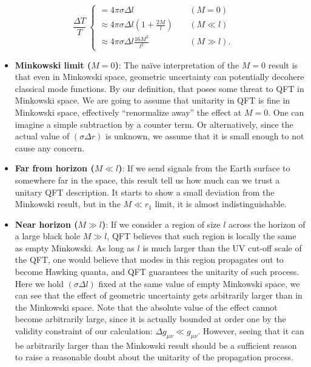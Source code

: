 \documentclass[aps,showpacs,onecolumn,floats,prd,superscriptaddress,nofootinbib]{revtex4-1}
\begin{document}
\begin{equation}
\frac{\Delta T}{T} ~ \begin{cases}
= 4 \pi \sigma \Delta l~	 &\ \ \ \ \ (M = 0)\\
\approx 4\pi \sigma \Delta l \left( 1 + \frac{2M}{l} \right) & \ \ \ \ \ (M \ll l)	\\
\approx 4 \pi  \sigma \Delta l \frac{16M^2}{l^2} & \ \ \ \ \ (M \gg l).
\end{cases}	\label{fin-result}
\end{equation}

\begin{itemize}

\item \textbf{Minkowski limit ($M=0$)}: 
The na\"ive interpretation of the $M=0$ result is that even in Minkowski space, geometric uncertainty can potentially decohere classical mode functions.
By our definition, that poses some threat to QFT in Minkowski space.
We are going to assume that unitarity in QFT is fine in Minkowski space, effectively ``renormalize away'' the effect at $M=0$.
One can imagine a simple subtraction by a counter term.
Or alternatively, since the actual value of $(\sigma\Delta r)$ is unknown, we assume that it is small enough to not cause any concern.

\item \textbf{Far from horizon ($M \ll l$)}: 
If we send signals from the Earth surface to somewhere far in the space, this result tell us how much can we trust a unitary QFT description.
It starts to show a small deviation from the Minkowski result, but in the $M \ll r_1$ limit, it is almost indistinguishable. 

\item \textbf{Near horizon ($M \gg l$)}: 
If we consider a region of size $l$ across the horizon of a large black hole $M\gg l$, QFT believes that such region is locally the same as empty Minkowski.
As long as $l$ is much larger than the UV cut-off scale of the QFT, one would believe that modes in this region propagates out to become Hawking quanta, and QFT guarantees the unitarity of such process.
Here we hold $(\sigma\Delta l)$ fixed at the same value of empty Minkowski space, we can see that the effect of geometric uncertainty gets arbitrarily larger than in the Minkowski space.
Note that the absolute value of the effect cannot become arbitrarily large, since it is actually bounded at order one by the validity constraint of our calculation: $\Delta g_{\mu\nu} \ll g_{\mu\nu}$.
However, seeing that it can be arbitrarily larger than the Minkowski result should be a sufficient reason to raise a reasonable doubt about the unitarity of the propagation process.



\end{itemize}
\end{document}
